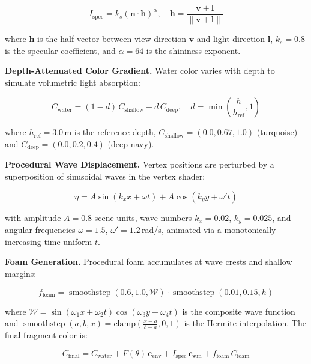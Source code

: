 \documentclass[11pt, a4paper]{article}
\newcommand{\vect}[1]{\boldsymbol{#1}}
\DeclareMathOperator{\smoothstep}{smoothstep}
\begin{document}
\begin{equation}
  I_{\text{spec}} = k_s \left(\vect{n} \cdot \vect{h}\right)^\alpha, \quad \vect{h} = \frac{\vect{v} + \vect{l}}{\|\vect{v} + \vect{l}\|}
  \label{eq:specular}
\end{equation}

\noindent where $\vect{h}$ is the half-vector between view direction $\vect{v}$ and light direction $\vect{l}$, $k_s = 0.8$ is the specular coefficient, and $\alpha = 64$ is the shininess exponent.

\textbf{Depth-Attenuated Color Gradient.} Water color varies with depth to simulate volumetric light absorption:

\begin{equation}
  C_{\text{water}} = (1 - d)\,C_{\text{shallow}} + d\,C_{\text{deep}}, \quad d = \min\!\left(\frac{h}{h_{\text{ref}}}, 1\right)
  \label{eq:depth_color}
\end{equation}

\noindent where $h_{\text{ref}} = 3.0$\,m is the reference depth, $C_{\text{shallow}} = (0.0, 0.67, 1.0)$ (turquoise) and $C_{\text{deep}} = (0.0, 0.2, 0.4)$ (deep navy).

\textbf{Procedural Wave Displacement.} Vertex positions are perturbed by a superposition of sinusoidal waves in the vertex shader:

\begin{equation}
  \eta = A\sin(k_x x + \omega t) + A\cos(k_y y + \omega' t)
  \label{eq:wave}
\end{equation}

\noindent with amplitude $A = 0.8$ scene units, wave numbers $k_x = 0.02$, $k_y = 0.025$, and angular frequencies $\omega = 1.5$, $\omega' = 1.2$\,rad/s, animated via a monotonically increasing time uniform $t$.

\textbf{Foam Generation.} Procedural foam accumulates at wave crests and shallow margins:

\begin{equation}
  f_{\text{foam}} = \smoothstep(0.6, 1.0, \mathcal{W}) \cdot \smoothstep(0.01, 0.15, h)
  \label{eq:foam}
\end{equation}

\noindent where $\mathcal{W} = \sin(\omega_1 x + \omega_2 t)\cos(\omega_3 y + \omega_4 t)$ is the composite wave function and $\smoothstep(a, b, x) = \text{clamp}\!\left(\frac{x-a}{b-a}, 0, 1\right)$ is the Hermite interpolation. The final fragment color is:

\begin{equation}
  C_{\text{final}} = C_{\text{water}} + F(\theta)\,\vect{c}_{\text{env}} + I_{\text{spec}}\,\vect{c}_{\text{sun}} + f_{\text{foam}}\,C_{\text{foam}}
  \label{eq:final_color}
\end{equation}
\end{document}
